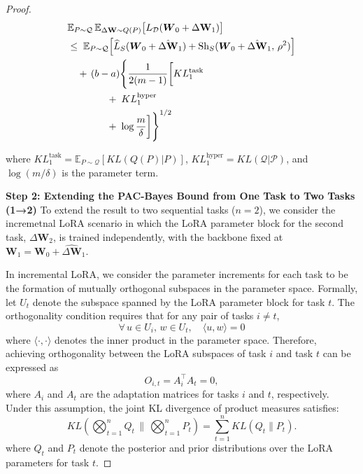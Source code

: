 \documentclass[letterpaper]{article} %
\begin{document}
\begin{proof}
\begin{align}
& \mathbb{E}_{P \sim \mathcal{Q}}\, \mathbb{E}_{\Delta\mathbf{W} \sim Q(P)} 
    \big[ L_{\mathcal{D}}(\boldsymbol{W}_0 + \Delta\mathbf{W}_1) \big] \notag \\
&\leq\; \mathbb{E}_{P \sim \mathcal{Q}} \Big[
        \widehat{L}_S(\boldsymbol{W}_0 + \hat{\Delta\mathbf{W}}_1)
        + \mathrm{Sh}_S(\boldsymbol{W}_0 + \hat{\Delta\mathbf{W}}_1,\, \rho^2)
    \Big] \notag \\
&\quad +\, (b-a) \Bigg\{
        \frac{1}{2(m-1)} \bigg[
            KL^{\text{task}}_1 \notag \\
&\qquad\qquad
            +\; KL^{\text{hyper}}_1 \notag \\
&\qquad\qquad
            +\; \log\frac{m}{\delta}
        \bigg]
    \Bigg\}^{1/2}
\label{eq:single-task-pac-bayes}
\end{align}



where $KL^{\text{task}}_1 = \mathbb{E}_{P \sim \mathcal{Q}}\left[ KL(Q(P)|P) \right]$,
$KL^{\text{hyper}}_1 = KL(\mathcal{Q}|\mathcal{P})$,
and $\log(m/\delta)$ is the parameter term.


\textbf{Step 2: Extending the PAC-Bayes Bound from One Task to Two Tasks  (1→2)}
To extend the result to two sequential tasks ($n=2$), we consider the incremetnal LoRA scenario in which the LoRA parameter block for the second task, $\Delta\mathbf{W}_2$, is trained independently, with the backbone fixed at $\mathbf{W}_1 = \mathbf{W}_0 + \hat{\Delta\mathbf{W}}_1$. 


In incremental LoRA, we consider the parameter increments for each task to be the formation of mutually orthogonal subspaces in the parameter space. Formally, let $U_t$ denote the subspace spanned by the LoRA parameter block for task $t$. The orthogonality condition requires that for any pair of tasks $i \neq t$,
$$ \forall\, u \in U_i,\, w \in U_t, \quad \langle u, w \rangle = 0$$
where $\langle \cdot, \cdot \rangle$ denotes the inner product in the parameter space. Therefore, achieving orthogonality between the LoRA subspaces of task $i$ and task $t$ can be expressed as
$${O}_{i,t} = A_i^{\top} A_t = 0,$$
where $A_i$ and $A_t$ are the adaptation matrices for tasks $i$ and $t$, respectively. Under this assumption, the joint KL divergence of product measures satisfies:   \begin{equation}
      KL\left(\bigotimes_{t=1}^n Q_t \, \bigg\| \, \bigotimes_{t=1}^n P_t\right) = \sum_{t=1}^n KL(Q_t \| P_t).
  \end{equation}
where $Q_t$ and $P_t$ denote the posterior and prior distributions over the LoRA parameters for task $t$.




\end{proof}
\end{document}
